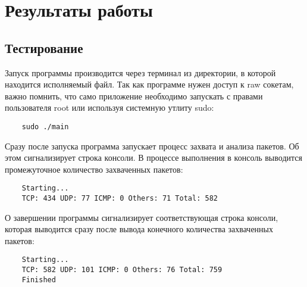 \section{Результаты работы}
\label{sec:result}

\subsection{Тестирование}

Запуск программы производится через терминал из директории, в которой
находится исполняемый файл. Так как программе нужен доступ к raw сокетам, 
важно помнить, что само приложение необходимо запускать с правами пользователя 
root\cite{linux} или используя системную утлиту sudo:
\begin{verbatim}
    sudo ./main
\end{verbatim}


Сразу после запуска программа запускает процесс захвата и анализа
пакетов. Об этом сигнализирует строка консоли. В процессе выполнения в
консоль выводится промежуточное количество захваченных пакетов:
\begin{verbatim}
    Starting...
    TCP: 434 UDP: 77 ICMP: 0 Others: 71 Total: 582
\end{verbatim}


О завершении программы сигнализирует соответствующая строка
консоли, которая выводится сразу после вывода конечного количества
захваченных пакетов:
\begin{verbatim}
    Starting...
    TCP: 582 UDP: 101 ICMP: 0 Others: 76 Total: 759
    Finished
\end{verbatim}


